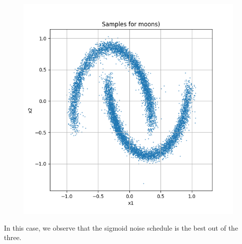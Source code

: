 \documentclass[a4paper,12pt]{article}
\begin{document}
\begin{figure}[H]
\begin{minipage}{0.3\textwidth}
  \end{minipage}
  \begin{minipage}{0.3\textwidth}
      \centering
      \includegraphics[width=\linewidth]{images/Samples for ddpm_2_200_0.0001_0.02_moons_sigmoid.png}
  \end{minipage}
\end{figure}
In this case, we observe that the sigmoid noise schedule is the best out of the three.
\end{document}
